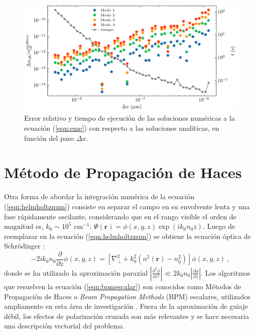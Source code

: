 \begin{figure}[H]
	\centering
	\includegraphics[width=\linewidth]{media/numerical_slab}
	\caption[Error relativo y tiempo de ejecución.]{Error relativo y tiempo de ejecución de las soluciones numéricas a la ecuación (\ref{eqn:eme}) con respecto a las soluciones analíticas, en función del paso $\Delta x$. \label{fig:emenumerror}}
\end{figure}
\section{Método de Propagación de Haces} 
Otra forma de abordar la integración numérica de la ecuación (\ref{eqn:helmholtznum}) consiste en separar el campo en su envolvente lenta y una fase rápidamente oscilante, considerando que en el rango visible el orden de magnitud es, $k_0 \sim 10 ^{5} \text{ cm}^{-1}$: $\Psi(\textbf{r}) = \phi(x,y,z)\exp(ik_0 n_0 z)$. Luego de reemplazar en la ecuación (\ref{eqn:helmholtznum}) se obtiene la ecuación óptica de Schrödinger \citep{paraxialschrodinger}:
\begin{equation}
	-2ik_0 n_0\frac{\partial }{\partial z}\phi(x,y, z) =  \left[\nabla_\perp^2 + k_0^2 (n^2(\textbf{r})-n_0^2)\right]\phi(x,y, z) \ , \label{eqn:bpmescalar}
\end{equation} 
donde se ha utilizado la aproximación paraxial $\left| \frac{\partial^2 \phi}{\partial z^2} \right| \ll 2 k_0 n_0\left| \frac{\partial \phi}{\partial z} \right|$. Los algoritmos que resuelven la ecuación (\ref{eqn:bpmescalar}) son conocidos como Métodos de Propagación de Haces o \textit{Beam Propagation Methods} (BPM) escalares, utilizados ampliamente en esta área de investigación \cite{bics, interorbital, OAMCaging, vortex, bpm}. Fuera de la aproximación de guiaje débil, los efectos de polarización cruzada son más relevantes y se hace necesaria una descripción vectorial del problema.
